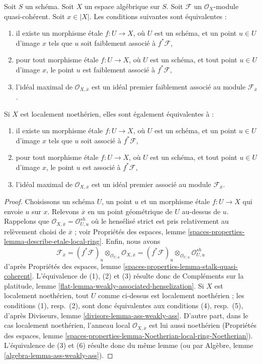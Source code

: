 \begin{lemma}
\label{lemma-associated}
Soit $S$ un schéma. Soit $X$ un espace algébrique sur $S$.
Soit $\mathcal{F}$ un $\mathcal{O}_X$-module quasi-cohérent.
Soit $x \in |X|$. Les conditions suivantes sont équivalentes :
\begin{enumerate}
\item il existe un morphisme \'etale $f : U \to X$, où $U$ est un schéma,
et un point $u \in U$ d'image $x$ tels que $u$ soit faiblement associé
à $f^*\mathcal{F}$,
\item pour tout morphisme \'etale $f : U \to X$, où $U$ est un schéma,
et tout point $u \in U$ d'image $x$, le point $u$ est faiblement associé
à $f^*\mathcal{F}$,
\item l'idéal maximal de $\mathcal{O}_{X, \overline{x}}$
est un idéal premier faiblement associé au module $\mathcal{F}_{\overline{x}}$.
\end{enumerate}
Si $X$ est localement noethérien, elles sont également équivalentes à :
\begin{enumerate}
\item[(4)] il existe un morphisme \'etale $f : U \to X$, où $U$ est un schéma,
et un point $u \in U$ d'image $x$ tels que $u$ soit associé
à $f^*\mathcal{F}$,
\item[(5)] pour tout morphisme \'etale $f : U \to X$, où $U$ est un schéma,
et tout point $u \in U$ d'image $x$, le point $u$ est associé
à $f^*\mathcal{F}$,
\item[(6)] l'idéal maximal de $\mathcal{O}_{X, \overline{x}}$
est un idéal premier associé au module $\mathcal{F}_{\overline{x}}$.
\end{enumerate}
\end{lemma}

\begin{proof}
Choisissons un schéma $U$, un point $u$ et un morphisme \'etale
$f : U \to X$ qui envoie $u$ sur $x$. Relevons $\overline{x}$ en un point
géométrique de $U$ au-dessus de $u$. Rappelons que
$\mathcal{O}_{X, \overline{x}} = \mathcal{O}_{U, u}^{sh}$
où le hensélisé strict est pris relativement au
relèvement choisi de $\overline{x}$ ; voir
Propriétés des espaces, lemme
\ref{spaces-properties-lemma-describe-etale-local-ring}.
Enfin, nous avons
$$
\mathcal{F}_{\overline{x}} =
(f^*\mathcal{F})_u \otimes_{\mathcal{O}_{U, u}}
\mathcal{O}_{X, \overline{x}} =
(f^*\mathcal{F})_u \otimes_{\mathcal{O}_{U, u}}
\mathcal{O}_{U, u}^{sh}
$$
d'après
Propriétés des espaces, lemme \ref{spaces-properties-lemma-stalk-quasi-coherent}.
L'équivalence de (1), (2) et (3) résulte donc de
Compléments sur la platitude, lemme \ref{flat-lemma-weakly-associated-henselization}.
Si $X$ est localement noethérien,
tout $U$ comme ci-dessus est localement noethérien ;
les conditions (1), resp.\ (2), sont donc équivalentes aux conditions (4), resp.\ (5), d'après
Diviseurs, lemme \ref{divisors-lemma-ass-weakly-ass}.
D'autre part, dans le cas localement noethérien,
l'anneau local $\mathcal{O}_{X, \overline{x}}$ est lui aussi noethérien
(Propriétés des espaces, lemme
\ref{spaces-properties-lemma-Noetherian-local-ring-Noetherian}).
L'équivalence de (3) et (6) résulte donc du même lemme
(ou par Algèbre, lemme \ref{algebra-lemma-ass-weakly-ass}).
\end{proof}

